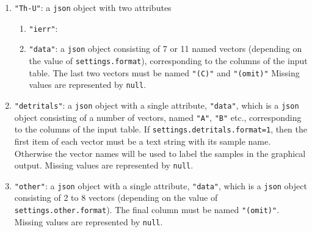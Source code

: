 \begin{refsection}
\begin{enumerate}[leftmargin=\parindent,align=left,
      labelwidth=\parindent,label*=3.\arabic*.]
\begin{enumerate}[leftmargin=\parindent,align=left,
      labelwidth=\parindent,label*=\arabic*.]
      spot size (only needed when \texttt{settings.format=2} or
      \texttt{3}).
    \item{\tt "data"}: a \texttt{json} object consisting of 4 to 14
      named vectors (depending on the value of
      \texttt{settings.format}), corresponding to the columns of the
      input table. The last two vectors must be named \texttt{"(C)"}
      and \texttt{"(omit)"}. For formats \texttt{settings.format=2}
      and \texttt{3}, in which different rows may have different
      lengths, missing values can be represented by \texttt{null}.
  \end{enumerate} 
\item{\tt "Th-U"}: a \texttt{json} object with two attributes
  \begin{enumerate}[leftmargin=\parindent,align=left,
      labelwidth=\parindent,label*=\arabic*.]
    \item{\tt "ierr"}: 
    \item{\tt "data"}: a \texttt{json} object consisting of 7 or 11
      named vectors (depending on the value of
      \texttt{settings.format}), corresponding to the columns of the
      input table. The last two vectors must be named \texttt{"(C)"}
      and \texttt{"(omit)"} Missing values are represented by
      \texttt{null}.
  \end{enumerate}  
\item{\tt "detritals"}: a \texttt{json} object with a single
  attribute, \texttt{"data"}, which is a \texttt{json} object
  consisting of a number of vectors, named \texttt{"A"}, \texttt{"B"}
  etc., corresponding to the columns of the input table. If
  \texttt{settings.detritals.format=1}, then the first item of each
  vector must be a text string with its sample name. Otherwise the
  vector names will be used to label the samples in the graphical
  output. Missing values are represented by \texttt{null}.
\item{\tt "other"}: a \texttt{json} object with a single attribute,
  \texttt{"data"}, which is a \texttt{json} object consisting of 2 to
  8 vectors (depending on the value of
  \texttt{settings.other.format}). The final column must be named
  \texttt{"(omit)"}. Missing values are represented by \texttt{null}.
\end{enumerate}

\printbibliography[heading=subbibliography]

\end{refsection}
